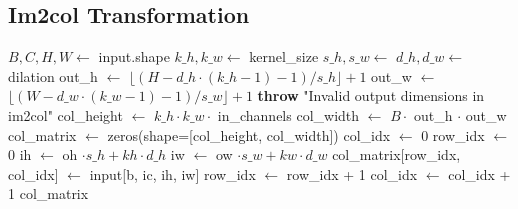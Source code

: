 \documentclass{article}
\begin{document}
\subsection{Im2col Transformation}
\begin{algorithm}
\caption{Im2col Transformation}
\begin{algorithmic}[1]
    \State $B, C, H, W \gets$ input.shape
    \State $k\_h, k\_w \gets$ kernel\_size
    \State $s\_h, s\_w \gets$ 
    \State $d\_h, d\_w \gets$ dilation
    \State out\_h $\gets$ $\lfloor (H - d\_h \cdot (k\_h - 1) - 1) / s\_h \rfloor + 1$
    \State out\_w $\gets$ $\lfloor (W - d\_w \cdot (k\_w - 1) - 1) / s\_w \rfloor + 1$
        \State \textbf{throw} "Invalid output dimensions in im2col"
    \EndIf
    \State col\_height $\gets$ $k\_h \cdot k\_w \cdot$ in\_channels
    \State col\_width $\gets$ $B \cdot$ out\_h $\cdot$ out\_w
    \State col\_matrix $\gets$ zeros(shape=[col\_height, col\_width])
    \State col\_idx $\gets$ 0
                \State row\_idx $\gets$ 0
                            \State ih $\gets$ oh $\cdot s\_h + kh \cdot d\_h$
                            \State iw $\gets$ ow $\cdot s\_w + kw \cdot d\_w$
                                \State col\_matrix[row\_idx, col\_idx] $\gets$ input[b, ic, ih, iw]
                            \EndIf
                            \State row\_idx $\gets$ row\_idx + 1
                        \EndFor
                    \EndFor
                \EndFor
                \State col\_idx $\gets$ col\_idx + 1
            \EndFor
        \EndFor
    \EndFor
    \State \Return col\_matrix
\EndFunction
\end{algorithmic}
\end{algorithm}
\end{document}
